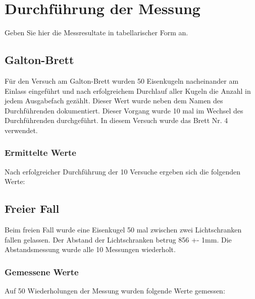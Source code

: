 \section{Durchführung der Messung}
 Geben Sie hier die Messresultate in tabellarischer Form an.

\subsection{Galton-Brett}
Für den Versuch am Galton-Brett wurden 50 Eisenkugeln nacheinander am Einlass eingeführt und nach erfolgreichem Durchlauf aller Kugeln die Anzahl in jedem Ausgabefach gezählt. Dieser Wert wurde neben dem Namen des Durchführenden dokumentiert.
Dieser Vorgang wurde 10 mal im Wechsel des Durchführenden durchgeführt.
\newline
In diesem Versuch wurde das Brett Nr. 4 verwendet.

\subsubsection{Ermittelte Werte}
Nach erfolgreicher Durchführung der 10 Versuche ergeben sich die folgenden Werte:
\begin{table}[thb]
  \centering
  \hline
  \caption{Messwerte aller Versuche am Galton-Brett}
\end{table}

\subsection{Freier Fall}
Beim freien Fall wurde eine Eisenkugel 50 mal zwischen zwei Lichtschranken fallen gelassen. Der Abstand der Lichtschranken betrug 856 +- 1mm.
Die Abstandsmessung wurde alle 10 Messungen wiederholt.

\subsubsection{Gemessene Werte}
Auf 50 Wiederholungen der Messung wurden folgende Werte gemessen:

